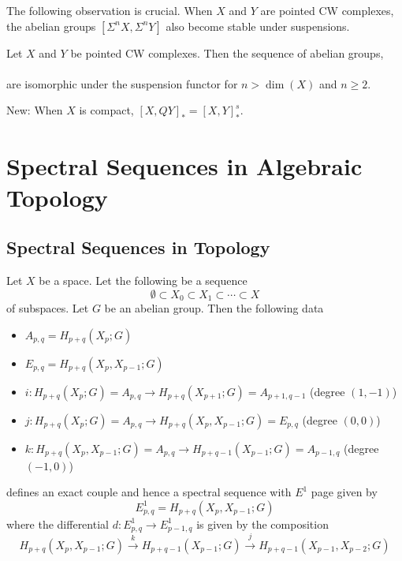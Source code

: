 \documentclass[a4paper]{article}
\begin{document}
The following observation is crucial. When $X$ and $Y$ are pointed CW complexes, the abelian groups $[\Sigma^n X,\Sigma^n Y]$ also become stable under suspensions. 

\begin{thm}{}{} Let $X$ and $Y$ be pointed CW complexes. Then the sequence of abelian groups, \\
\\
are isomorphic under the suspension functor for $n>\dim(X)$ and $n\geq 2$. 
\end{thm}

New: When $X$ is compact, $[X,QY]_\ast=[X,Y]_\ast^s$. 


\pagebreak
\section{Spectral Sequences in Algebraic Topology}
\subsection{Spectral Sequences in Topology}
\begin{thm}{}{} Let $X$ be a space. Let the following be a sequence $$\emptyset\subset X_0\subset X_1\subset\cdots\subset X$$ of subspaces. Let $G$ be an abelian group. Then the following data
\begin{itemize}
\item $A_{p,q}=H_{p+q}(X_p;G)$
\item $E_{p,q}=H_{p+q}(X_p,X_{p-1};G)$
\item $i:H_{p+q}(X_p;G)=A_{p,q}\to H_{p+q}(X_{p+1};G)=A_{p+1,q-1}$ (degree $(1,-1)$)
\item $j:H_{p+q}(X_p;G)=A_{p,q}\to H_{p+q}(X_p,X_{p-1};G)=E_{p,q}$ (degree $(0,0)$)
\item $k:H_{p+q}(X_p,X_{p-1};G)=A_{p,q}\to H_{p+q-1}(X_{p-1};G)=A_{p-1,q}$ (degree $(-1,0)$)
\end{itemize}
defines an exact couple and hence a spectral sequence with $E^1$ page given by $$E_{p,q}^1=H_{p+q}(X_p,X_{p-1};G)$$ where the differential $d:E_{p,q}^1\to E_{p-1,q}^1$ is given by the composition $$H_{p+q}(X_p,X_{p-1};G)\overset{k}{\longrightarrow}H_{p+q-1}(X_{p-1};G)\overset{j}{\longrightarrow} H_{p+q-1}(X_{p-1},X_{p-2};G)$$
\end{thm}
\end{document}
